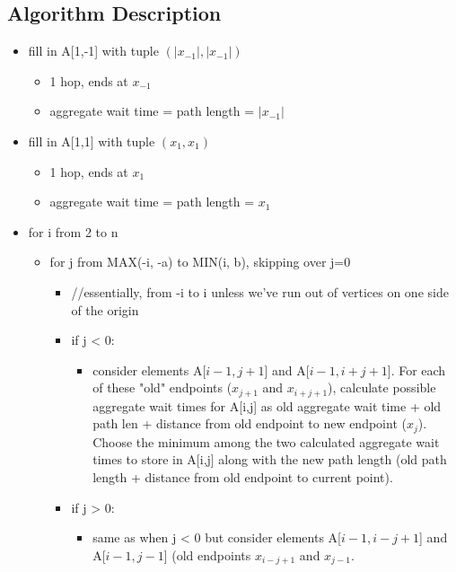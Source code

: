 \documentclass[a4paper]{article}
\begin{document}
\subsection{Algorithm Description}

\begin{itemize}
    \item fill in A[1,-1] with tuple $(\lvert x_{-1} \rvert, \lvert x_{-1} \rvert)$
    \begin{itemize}
        \item 1 hop, ends at $x_{-1}$
        \item aggregate wait time = path length = $\lvert x_{-1} \rvert$
    \end{itemize}
    \item fill in A[1,1] with tuple $(x_{1}, x_{1})$
    \begin{itemize}
        \item 1 hop, ends at $x_1$
        \item aggregate wait time = path length = $x_1$
    \end{itemize}
\end{itemize}

\begin{itemize}
    \item for i from 2 to n
    \begin{itemize}
        \item for j from MAX(-i, -a) to MIN(i, b), skipping over j=0
        \begin{itemize}
            \item //essentially, from -i to i unless we've run out of vertices on one side of the origin
            \item if j < 0:
            \begin{itemize}
                \item consider elements A[$i-1, j+1$] and A[$i-1, i+j+1$]. For each of these "old" endpoints ($x_{j+1}$ and $x_{i+j+1}$), calculate possible aggregate wait times for A[i,j] as old aggregate wait time + old path len + distance from old endpoint to new endpoint ($x_j$). Choose the minimum among the two calculated aggregate wait times to store in A[i,j] along with the new path length (old path length + distance from old endpoint to current point).
            \end{itemize}
            \item if j > 0:
            \begin{itemize}
                \item same as when j < 0 but consider elements A[$i-1, i-j+1$] and A[$i-1, j-1$] (old endpoints $x_{i-j+1}$ and $x_{j-1}$.
            \end{itemize}
        \end{itemize}
    \end{itemize}
\end{itemize}
\end{document}
